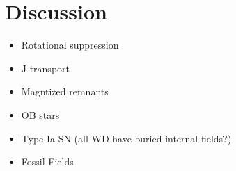 \section{Discussion}
\begin{itemize}
\item Rotational suppression
\item J-transport
\item Magntized remnants
\item OB stars
\item Type Ia SN (all WD have buried internal fields?)
\item Fossil Fields
\end{itemize}